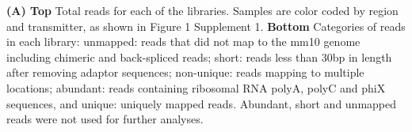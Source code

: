 \textbf{(A) Top} Total reads for each of the libraries. Samples are color coded by region and transmitter, as shown in Figure 1 Supplement 1.
\textbf{Bottom} Categories of reads in each library: unmapped: reads that did not map to the mm10 genome including chimeric and back-spliced reads; short: reads less than 30bp in length after removing adaptor sequences; non-unique: reads mapping to multiple locations; abundant: reads containing ribosomal RNA polyA, polyC and phiX sequences, and unique: uniquely mapped reads. Abundant, short and unmapped reads were not used for further analyses. 
